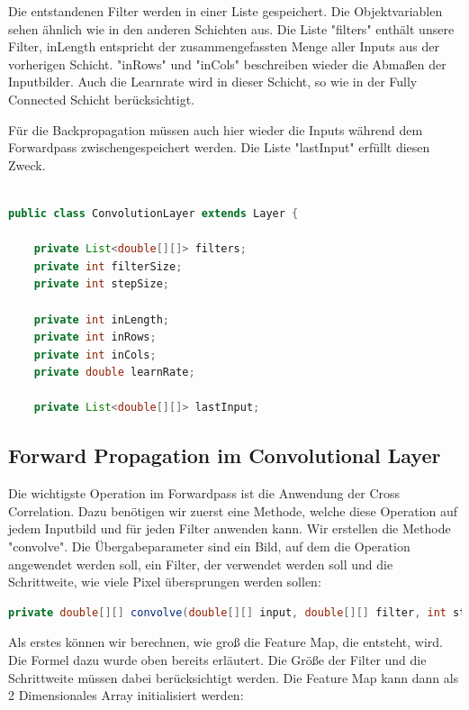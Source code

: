 \documentclass[12pt]{article}
\begin{document}
Die entstandenen Filter werden in einer Liste gespeichert. Die Objektvariablen sehen ähnlich wie in den anderen Schichten aus. Die Liste "filters" enthält unsere Filter, inLength entspricht der zusammengefassten Menge aller Inputs aus der vorherigen Schicht. "inRows" und "inCols" beschreiben wieder die Abmaßen der Inputbilder. Auch die Learnrate wird in dieser Schicht, so wie in der Fully Connected Schicht berücksichtigt.

Für die Backpropagation müssen auch hier wieder die Inputs während dem Forwardpass zwischengespeichert werden. Die Liste "lastInput" erfüllt diesen Zweck.

\begin{lstlisting}[language=Java]

public class ConvolutionLayer extends Layer {

    private List<double[][]> filters;
    private int filterSize;
    private int stepSize;

    private int inLength;
    private int inRows;
    private int inCols;
    private double learnRate;

    private List<double[][]> lastInput;

\end{lstlisting}


\subsection{Forward Propagation im Convolutional Layer}

Die wichtigste Operation im Forwardpass ist die Anwendung der Cross Correlation. Dazu benötigen wir zuerst eine Methode, welche diese Operation auf jedem Inputbild und für jeden Filter anwenden kann. 
Wir erstellen die Methode "convolve". Die Übergabeparameter sind ein Bild, auf dem die Operation angewendet werden soll, ein Filter, der verwendet werden soll und die Schrittweite, wie viele Pixel übersprungen werden sollen:

\begin{lstlisting}[language=Java]
private double[][] convolve(double[][] input, double[][] filter, int stepSize) {
\end{lstlisting}

Als erstes können wir berechnen, wie groß die Feature Map, die entsteht, wird. Die Formel dazu wurde oben bereits erläutert. Die Größe der Filter und die Schrittweite müssen dabei berücksichtigt werden. Die Feature Map kann dann als 2 Dimensionales Array initialisiert werden:
\end{document}
